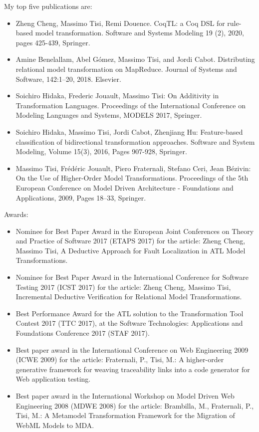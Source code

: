 \medskip
My top five publications are:
\begin{itemize}
\item Zheng Cheng, Massimo Tisi, Remi Douence. CoqTL: a Coq DSL for rule-based model transformation. Software and Systems Modeling 19 (2), 2020, pages 425-439, Springer.
\item Amine Benelallam, Abel Gómez, Massimo Tisi, and Jordi Cabot. Distributing relational model transformation on MapReduce. Journal of Systems and Software, 142:1–20, 2018. Elsevier.
\item Soichiro Hidaka, Frederic Jouault, Massimo Tisi: On Additivity in Transformation Languages. Proceedings of the International Conference on Modeling Languages and Systems, MODELS 2017, Springer.
\item Soichiro Hidaka, Massimo Tisi, Jordi Cabot, Zhenjiang Hu: Feature-based classification of bidirectional transformation approaches. Software and System Modeling, Volume 15(3), 2016, Pages 907-928, Springer.
\item Massimo Tisi, Frédéric Jouault, Piero Fraternali, Stefano Ceri, Jean Bézivin: On the Use of Higher-Order Model Transformations. Proceedings of the 5th European Conference on Model Driven Architecture - Foundations and Applications, 2009, Pages 18–33, Springer.
\end{itemize}

\medskip
Awards: 
\begin{itemize}
\item Nominee for Best Paper Award in the European Joint Conferences on Theory and Practice of Software 2017 (ETAPS 2017) for the article: Zheng Cheng, Massimo Tisi, A Deductive Approach for Fault Localization in ATL Model Transformations.
\item Nominee for Best Paper Award in the International Conference for Software Testing 2017 (ICST 2017) for the article: Zheng Cheng, Massimo Tisi, Incremental Deductive Verification for Relational Model Transformations.
\item Best Performance Award for the ATL solution to the Transformation Tool Contest 2017 (TTC 2017), at the Software Technologies: Applications and Foundations Conference 2017 (STAF 2017).
\item Best paper award in the International Conference on Web Engineering 2009 (ICWE 2009) for the article: Fraternali, P., Tisi, M.: A higher-order generative framework for weaving traceability links into a code generator for Web application testing.
\item Best paper award in the International Workshop on Model Driven Web Engineering 2008 (MDWE 2008) for the article: Brambilla, M., Fraternali, P., Tisi, M.: A Metamodel Transformation Framework for the Migration of WebML Models to MDA.
\end{itemize}

